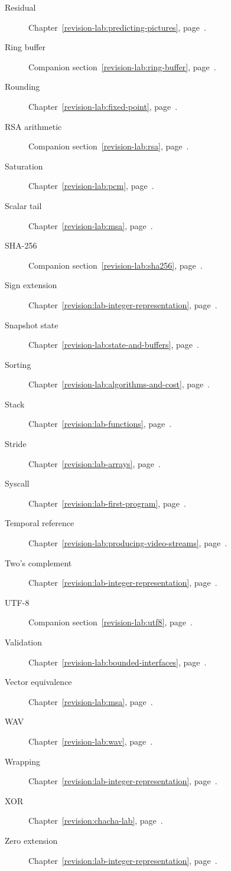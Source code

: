 \begin{description}
  \item[Residual] Chapter~\ref{revision-lab:predicting-pictures}, page~\pageref{revision-lab:predicting-pictures}.
  \item[Ring buffer] Companion section~\ref{revision-lab:ring-buffer}, page~\pageref{revision-lab:ring-buffer}.
  \item[Rounding] Chapter~\ref{revision-lab:fixed-point}, page~\pageref{revision-lab:fixed-point}.
  \item[RSA arithmetic] Companion section~\ref{revision-lab:rsa}, page~\pageref{revision-lab:rsa}.
  \item[Saturation] Chapter~\ref{revision-lab:pcm}, page~\pageref{revision-lab:pcm}.
  \item[Scalar tail] Chapter~\ref{revision-lab:msa}, page~\pageref{revision-lab:msa}.
  \item[SHA-256] Companion section~\ref{revision-lab:sha256}, page~\pageref{revision-lab:sha256}.
  \item[Sign extension] Chapter~\ref{revision:lab-integer-representation}, page~\pageref{revision:lab-integer-representation}.
  \item[Snapshot state] Chapter~\ref{revision-lab:state-and-buffers}, page~\pageref{revision-lab:state-and-buffers}.
  \item[Sorting] Chapter~\ref{revision-lab:algorithms-and-cost}, page~\pageref{revision-lab:algorithms-and-cost}.
  \item[Stack] Chapter~\ref{revision:lab-functions}, page~\pageref{revision:lab-functions}.
  \item[Stride] Chapter~\ref{revision:lab-arrays}, page~\pageref{revision:lab-arrays}.
  \item[Syscall] Chapter~\ref{revision:lab-first-program}, page~\pageref{revision:lab-first-program}.
  \item[Temporal reference] Chapter~\ref{revision-lab:producing-video-streams}, page~\pageref{revision-lab:producing-video-streams}.
  \item[Two's complement] Chapter~\ref{revision:lab-integer-representation}, page~\pageref{revision:lab-integer-representation}.
  \item[UTF-8] Companion section~\ref{revision-lab:utf8}, page~\pageref{revision-lab:utf8}.
  \item[Validation] Chapter~\ref{revision-lab:bounded-interfaces}, page~\pageref{revision-lab:bounded-interfaces}.
  \item[Vector equivalence] Chapter~\ref{revision-lab:msa}, page~\pageref{revision-lab:msa}.
  \item[WAV] Chapter~\ref{revision-lab:wav}, page~\pageref{revision-lab:wav}.
  \item[Wrapping] Chapter~\ref{revision:lab-integer-representation}, page~\pageref{revision:lab-integer-representation}.
  \item[XOR] Chapter~\ref{revision:chacha-lab}, page~\pageref{revision:chacha-lab}.
  \item[Zero extension] Chapter~\ref{revision:lab-integer-representation}, page~\pageref{revision:lab-integer-representation}.
\end{description}
